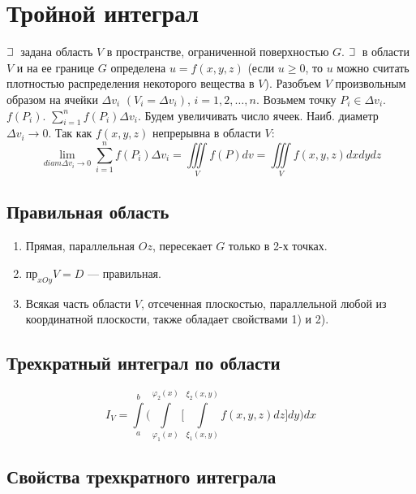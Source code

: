 \documentclass[a4paper,12pt,oneside]{extbook}
\def\lets{%
    \mathord{\setbox0=\hbox{$\exists$}%
        \hbox{\kern 0.125\wd0%
            \vbox to \ht0{%
                \hrule width 0.75\wd0%
                \vfill%
                \hrule width 0.75\wd0}%
            \vrule height \ht0%
            \kern 0.125\wd0}%
    }%
    \hspace{2pt}
}
\theoremstyle{numbered}
\theoremstyle{unnumbered}
\theoremstyle{named}
\theoremstyle{unnumbered}
\theoremstyle{named}
\theoremstyle{named}
\theoremstyle{named}
\begin{document}
\chapter{Тройной интеграл}
\label{cha:Тройной интеграл}

\(\lets\) задана область \(V\) в пространстве, ограниченной поверхностью \(G\). \(\lets\) в области \(V\) и на ее границе \(G\) определена \(u = f(x, y, z)\) (если \(u \geq 0\), то \(u\) можно считать плотностью распределения некоторого вещества в \(V\)). Разобъем \(V\) произвольным образом на ячейки \(\Delta v_i\) \((V_i = \Delta v_i)\), \(i = 1, 2, \ldots, n\). Возьмем точку \(P_i \in \Delta v_i\). \(f(P_i)\). \(\sum_{i=1}^n f(P_i)\Delta v_i\). Будем увеличивать число ячеек. Наиб. диаметр \(\Delta v_i \to 0\). Так как \(f(x, y, z)\) непрерывна в области \(V\):
\begin{equation}
    \lim_{diam \Delta v_i \to 0}{\sum_{i = 1}^n f(P_i)\Delta v_i} = \iiint\limits_V f(P)dv = \iiint\limits_V f(x, y, z)dxdydz
\end{equation}

\section{Правильная область}
\label{sec:Правильная область}

\begin{enumerate}
    \item Прямая, параллельная \(Oz\), пересекает \(G\) только в 2-х точках.
    \item \(\text{пр}_{xOy} V = D\) — правильная.
    \item Всякая часть области \(V\), отсеченная плоскостью, параллельной любой из координатной плоскости, также обладает свойствами 1) и 2).
\end{enumerate}

\section{Трехкратный интеграл по области}
\label{sec:Трехкратный интеграл по области}

\begin{equation}
    I_V = \int\limits_{a}^{b} \Big( \int\limits_{\varphi_1(x)}^{\varphi_2(x)} \Big[ \int\limits_{\xi_1(x, y)}^{\xi_2(x, y)} f(x, y, z) dz \Big] dy \Big) dx
\end{equation}

\section{Свойства трехкратного интеграла}
\label{sec:Свойства трехкратного интеграла}
\end{document}
